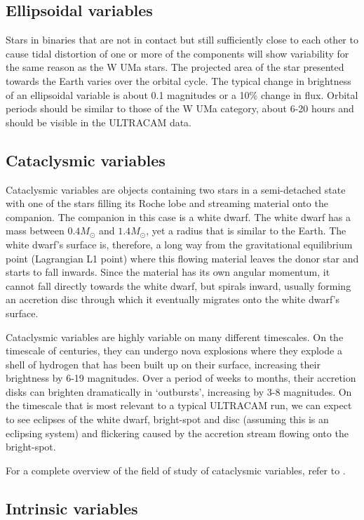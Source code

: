 \subsection{Ellipsoidal variables}
Stars in binaries that are not in contact but still sufficiently close to each other to cause tidal distortion of one or more of the components will show variability for the same reason as the {W UMa} stars. The projected area of the star presented towards the Earth varies over the orbital cycle. The typical change in brightness of an ellipsoidal variable is about 0.1 magnitudes or a 10\% change in flux. Orbital periods should be similar to those of the {W UMa} category, about 6-20 hours and should be visible in the ULTRACAM data. 

\subsection{Cataclysmic variables}
Cataclysmic variables are objects containing two stars in a semi-detached state with one of the stars filling its Roche lobe and streaming material onto the companion. The companion in this case is a white dwarf. The white dwarf has a mass between $0.4 M_{\odot}$ and $1.4 M_{\odot}$, yet a radius that is similar to the Earth. The white dwarf's surface is, therefore, a long way from the gravitational equilibrium point (Lagrangian L1 point) where this flowing material leaves the donor star and starts to fall inwards. Since the material has its own angular momentum, it cannot fall directly towards the white dwarf, but spirals inward, usually forming an accretion disc through which it eventually migrates onto the white dwarf's surface. 

Cataclysmic variables are highly variable on many different timescales. On the timescale of centuries, they can undergo nova explosions where they explode a shell of hydrogen that has been built up on their surface, increasing their brightness by 6-19 magnitudes. Over a period of weeks to months, their accretion disks can brighten dramatically in `outbursts', increasing by 3-8 magnitudes. On the timescale that is most relevant to a typical ULTRACAM run, we can expect to see eclipses of the white dwarf, bright-spot and disc (assuming this is an eclipsing system) and flickering caused by the accretion stream flowing onto the bright-spot. 

For a complete overview of the field of study of cataclysmic variables, refer to \citet{WarnerBook}. 

\subsection{Intrinsic variables}

